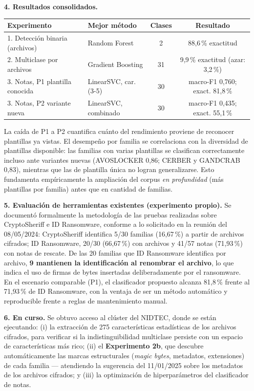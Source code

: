 \documentclass[11pt,a4paper]{article}
\begin{document}
\textbf{4. Resultados consolidados.}

\begin{center}
\small
\begin{tabular}{@{}llcc@{}}
\toprule
\textbf{Experimento} & \textbf{Mejor método} & \textbf{Clases} & \textbf{Resultado} \\
\midrule
1. Detección binaria (archivos) & Random Forest & 2 & 88{,}6\,\% exactitud \\
2. Multiclase por archivos & Gradient Boosting & 31 & 9{,}9\,\% exactitud (azar: 3{,}2\,\%) \\
3. Notas, P1 plantilla conocida & LinearSVC, car. (3-5) & 30 & macro-F1 0{,}760; exact. 81{,}8\,\% \\
3. Notas, P2 variante nueva & LinearSVC, combinado & 30 & macro-F1 0{,}435; exact. 55{,}1\,\% \\
\bottomrule
\end{tabular}
\end{center}

La caída de P1 a P2 cuantifica cuánto del rendimiento proviene de reconocer plantillas ya
vistas. El desempeño por familia se correlaciona con la diversidad de plantillas disponible:
las familias con varias plantillas se clasifican correctamente incluso ante variantes nuevas
(AVOSLOCKER 0{,}86; CERBER y GANDCRAB 0{,}83), mientras que las de plantilla única no logran
generalizarse. Esto fundamenta empíricamente la ampliación del corpus \emph{en profundidad}
(más plantillas por familia) antes que en cantidad de familias.

\textbf{5. Evaluación de herramientas existentes (experimento propio).} Se documentó
formalmente la metodología de las pruebas realizadas sobre CryptoSheriff e ID Ransomware,
conforme a lo solicitado en la reunión del 08/05/2024: CryptoSheriff identifica 5/30 familias
(16{,}67\,\%) a partir de archivos cifrados; ID Ransomware, 20/30 (66{,}67\,\%) con archivos y
41/57 notas (71{,}93\,\%) con notas de rescate. De las 20 familias que ID Ransomware identifica
por archivo, \textbf{9 mantienen la identificación al renombrar el archivo}, lo que indica el
uso de firmas de bytes insertadas deliberadamente por el ransomware. En el escenario comparable
(P1), el clasificador propuesto alcanza 81{,}8\,\% frente al 71{,}93\,\% de ID Ransomware, con
la ventaja de ser un método automático y reproducible frente a reglas de mantenimiento manual.

\textbf{6. En curso.} Se obtuvo acceso al clúster del NIDTEC, donde se están ejecutando:
(i) la extracción de 275 características estadísticas de los archivos cifrados, para verificar
si la indistinguibilidad multiclase persiste con un espacio de características más rico;
(ii) el \textbf{Experimento 2b}, que descubre automáticamente las marcas estructurales
(\emph{magic bytes}, metadatos, extensiones) de cada familia --- atendiendo la sugerencia del
11/01/2025 sobre los metadatos de los archivos cifrados; y (iii) la optimización de
hiperparámetros del clasificador de notas.
\end{document}
